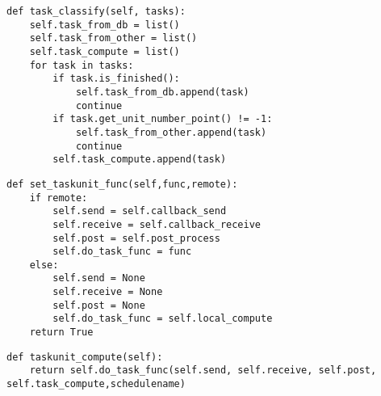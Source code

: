 


\begin{lstlisting}
def task_classify(self, tasks):
    self.task_from_db = list()
    self.task_from_other = list()
    self.task_compute = list()
    for task in tasks:
        if task.is_finished():
            self.task_from_db.append(task)
            continue
        if task.get_unit_number_point() != -1:   
            self.task_from_other.append(task)
            continue
        self.task_compute.append(task)
\end{lstlisting}





\begin{lstlisting}
def set_taskunit_func(self,func,remote):
    if remote:
        self.send = self.callback_send
        self.receive = self.callback_receive
        self.post = self.post_process
        self.do_task_func = func
    else:
        self.send = None
        self.receive = None
        self.post = None
        self.do_task_func = self.local_compute
    return True 
\end{lstlisting}



\begin{lstlisting}
def taskunit_compute(self):
    return self.do_task_func(self.send, self.receive, self.post, self.task_compute,schedulename)
\end{lstlisting}

